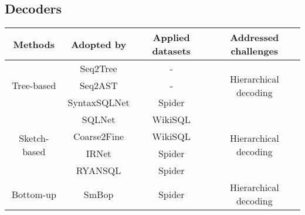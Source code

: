 \subsection{Decoders}

\begin{table}
    \centering
    \begin{tabular}{|c|c|c|c|}
        \hline
        \rowcolor{Gray}
        \textbf{Methods}                                           & \textbf{Adopted by} & \textbf{Applied datasets} & \textbf{Addressed challenges}                                                            \\
        \hline
        \multirow{3}{*}{Tree-based}                                & Seq2Tree            & -                         & \multirow{3}{*}{Hierarchical decoding}                                                   \\
                                                                   & Seq2AST             & -                         &                                                                                          \\
                                                                   & SyntaxSQLNet        & Spider                    &                                                                                          \\
        \hline
        \multirow{4}{*}{Sketch-based}                              & SQLNet              & WikiSQL                   & \multirow{4}{*}{Hierarchical decoding}                                                   \\
                                                                   & Coarse2Fine         & WikiSQL                   &                                                                                          \\
                                                                   & IRNet               & Spider                    &                                                                                          \\
                                                                   & RYANSQL             & Spider                    &                                                                                          \\
        \hline
        Bottom-up                                                  & SmBop               & Spider                    & Hierarchical decoding                                                                    \\

\end{tabular}
\end{table}
